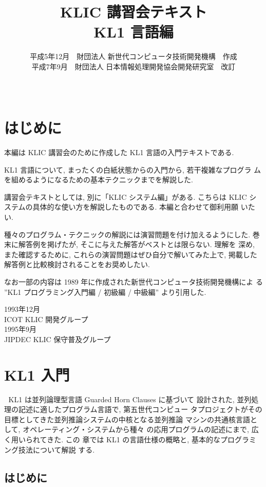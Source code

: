 \documentclass[a4,titlepage]{jsreport}
\title{KLIC 講習会テキスト\\KL1 言語編}
\date{\ }
\author{平成5年12月~~財団法人 新世代コンピュータ技術開発機構~~作成
\\平成7年9月~~財団法人 日本情報処理開発協会開発研究室~~改訂}
\begin{document}
\maketitle

\chapter*{はじめに}

\bgroup\large
本編は KLIC 講習会のために作成した KL1 言語の入門テキストである.

KL1 言語について, まったくの白紙状態からの入門から, 若干複雑なプログラ
ムを組めるようになるための基本テクニックまでを解説した.

講習会テキストとしては, 別に「KLIC システム編」がある.  こちらは KLIC 
システムの具体的な使い方を解説したものである.  本編と合わせて御利用願
いたい.

種々のプログラム・テクニックの解説には演習問題を付け加えるようにした.
巻末に解答例を掲げたが, そこに与えた解答がベストとは限らない.  理解を
深め, また確認するために, これらの演習問題はぜひ自分で解いてみた上で, 
掲載した解答例と比較検討されることをお奨めしたい.

なお一部の内容は 1989 年に作成された新世代コンピュータ技術開発機構によ
る ''KL1 プログラミング入門編 / 初級編 / 中級編'' より引用した.

\begin{flushright}
1993年12月\\
ICOT KLIC 開発グループ\\
1995年9月\\
JIPDEC KLIC 保守普及グループ
\end{flushright}
\egroup
\thispagestyle{empty}

\newpage
\setcounter{page}{0}
\tableofcontents

\chapter{KL1 入門}
\setcounter{page}{0}
\pagestyle{plain}

KL1 は並列論理型言語 Guarded Horn Clauses\cite{GHCoriginal} に基づいて
設計された, 並列処理の記述に適したプログラム言語で, 第五世代コンピュー
タプロジェクトがその目標としてきた並列推論システムの中核となる並列推論
マシンの共通核言語として, オペレーティング・システム\cite{PIMOS}から種々
の応用プログラムの記述にまで, 広く用いられてきた.\cite{KL-Design} この
章では KL1 の言語仕様の概略と, 基本的なプログラミング技法について解説
する.

\section{はじめに}
\end{document}
